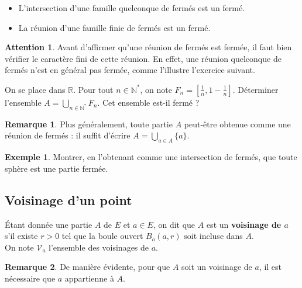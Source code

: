 \documentclass[french]{article}
\newcommand{\N}{\mathbb{N}}
\newcommand{\R}{\mathbb{R}}
\newcommand{\st}{^*}
\theoremstyle{plain}
\theoremstyle{definition}
\newtheorem*{ex}{Exemple}
\newtheorem*{rmq}{Remarque}
\newtheorem*{attention}{Attention}
\theoremstyle{remark}
\begin{document}
\begin{prop}%
	\begin{itemize}
		\item L'intersection d'une famille quelconque de fermés est un fermé.
		\item La réunion d'une famille finie de fermés est un fermé.
	\end{itemize}
\end{prop}

\begin{attention}
	Avant d'affirmer qu'une réunion de fermés est fermée, il faut bien vérifier le caractère fini de cette réunion. En effet, une réunion quelconque de fermés n'est en général pas fermée, comme l'illustre l'exercice suivant.
\end{attention}

\begin{exo}
	On se place dans $\R$. Pour tout $n\in\N\st$, on note $F_n=\left[\frac{1}{n},1-\frac{1}{n}\right]$. Déterminer l'ensemble $A=\displaystyle\bigcup_{n\in\N\st}F_n$. Cet ensemble est-il fermé ?
\end{exo}

\begin{rmq}
	Plus généralement, toute partie $A$ peut-être obtenue comme une réunion de fermés : il suffit d'écrire $A=\displaystyle\bigcup_{a\in A}\{a\}$.
\end{rmq}

\begin{ex}
	Montrer, en l'obtenant comme une intersection de fermés, que toute sphère est une partie fermée.
\end{ex}

\subsection{Voisinage d'un point}

\begin{dfn}
	Étant donnée une partie $A$ de $E$ et $a\in E$, on dit que $A$ est un \textbf{voisinage de $a$} s'il existe $r>0$ tel que la boule ouvert $B_o(a,r)$ soit incluse dans $A$. \\
	On note $\mathcal{V}_a$ l'ensemble des voisinages de $a$.
\end{dfn}

\begin{rmq}
	De manière évidente, pour que $A$ soit un voisinage de $a$, il est nécessaire que $a$ appartienne à $A$.
\end{rmq}
\end{document}
